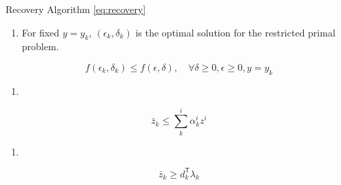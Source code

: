 \documentclass[../main]{subfiles}
\begin{document}
\begin{theorem} \label{lemma:recovery}  Recovery Algorithm \eqref{eq:recovery}
  \begin{enumerate}
    \def\labelenumi{(\alph{enumi})}

    \item
          For fixed \(y=y_k\), \((\epsilon_k, \delta_k)\) is the optimal
          solution for the restricted primal problem.
  \end{enumerate}

  \[f(\epsilon_k, \delta_k) \le f(\epsilon, \delta), \quad \forall \delta\ge 0, \epsilon\ge 0, y= y_k\]

  \begin{enumerate}
    \def\labelenumi{(\alph{enumi})}
    \setcounter{enumi}{1}

    \item
  \end{enumerate}

  \[\bar z_k \le \sum^i_k \alpha^i_k z^i\]
  \begin{enumerate}
    \def\labelenumi{(\alph{enumi})}
    \setcounter{enumi}{2}

    \item
  \end{enumerate}
  \[\bar z_k \ge d_k^\mathsf{T} \lambda_k\]

\end{theorem}
\end{document}
